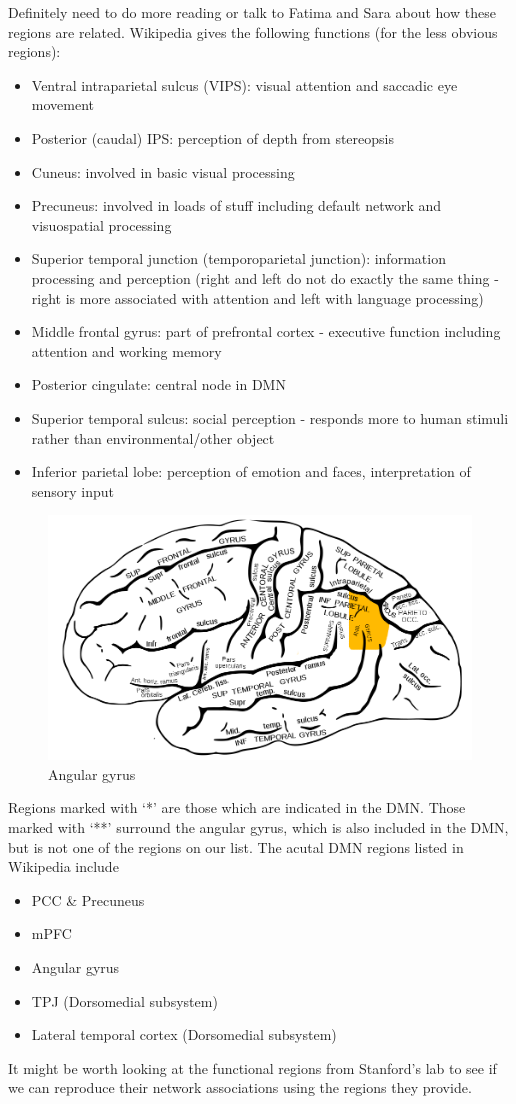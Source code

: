 \documentclass[11pt]{article}
\begin{document}
Definitely need to do more reading or talk to Fatima and Sara about how these regions are related. Wikipedia gives the following functions (for the less obvious regions):
\begin{itemize}
\item Ventral intraparietal sulcus (VIPS): visual attention and saccadic eye movement
\item Posterior (caudal) IPS: perception of depth from stereopsis
\item Cuneus: involved in basic visual processing
\item Precuneus: involved in loads of stuff including default network and visuospatial processing
\item Superior temporal junction (temporoparietal junction): information processing and perception (right and left do not do exactly the same thing - right is more associated with attention and left with language processing)
\item Middle frontal gyrus: part of prefrontal cortex - executive function including attention and working memory
\item Posterior cingulate: central node in DMN
\item Superior temporal sulcus: social perception - responds more to human stimuli rather than environmental/other object
\item Inferior parietal lobe: perception of emotion and faces, interpretation of sensory input
\end{itemize}

\begin{figure}
\includegraphics[width=.5\textwidth]{pictures/Gray726_angular_gyrus.png}
\caption{Angular gyrus}
\end{figure}

Regions marked with `*' are those which are indicated in the DMN. Those marked with `**' surround the angular gyrus, which is also included in the DMN, but is not one of the regions on our list. The acutal DMN regions listed in Wikipedia include
\begin{itemize}
\item PCC \& Precuneus
\item mPFC
\item Angular gyrus
\item TPJ (Dorsomedial subsystem)
\item Lateral temporal cortex (Dorsomedial subsystem)
\end{itemize}
It might be worth looking at the functional regions from Stanford's lab to see if we can reproduce their network associations using the regions they provide.
\end{document}
